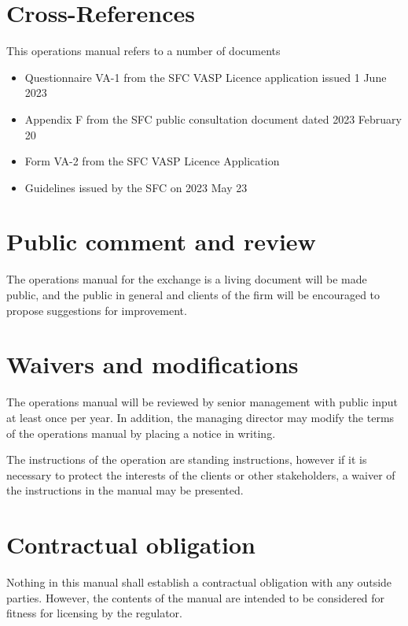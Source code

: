 \section{Cross-References}
This operations manual refers to a number of documents
\begin{itemize}
  \item Questionnaire VA-1 from the SFC VASP Licence application
    issued 1 June 2023
  \item Appendix F from the SFC public consultation document dated
    2023 February 20
  \item Form VA-2 from the SFC VASP Licence Application
  \item Guidelines issued by the SFC on 2023 May 23
\end{itemize}

\section{Public comment and review}
The operations manual for the exchange is a living document will be
made public, and the public in general and clients of the firm will be
encouraged to propose suggestions for improvement.

\section{Waivers and modifications}
The operations manual will be reviewed by senior management with
public input at least once per year.  In addition, the managing
director may modify the terms of the operations manual by placing a
notice in writing.

The instructions of the operation are standing instructions, however
if it is necessary to protect the interests of the
clients or other stakeholders, a waiver of the instructions in the
manual may be presented.

\section{Contractual obligation}
Nothing in this manual shall establish a contractual obligation with
any outside parties.  However, the contents of the manual are intended
to be considered for fitness for licensing by the regulator.

